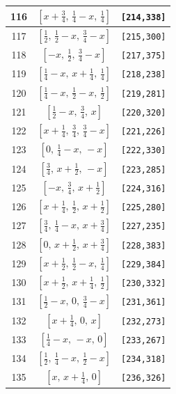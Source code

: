 \documentclass[fleqn,8pt]{jsarticle}
\begin{document}
\begin{longtable}{ccc}
116 & $\left[ x + \frac{3}{4},\, \frac{1}{4} - x,\, \frac{1}{4} \right]$ & {\tt [214,338]} \\ \hline
117 & $\left[ \frac{1}{2},\, \frac{1}{2} - x,\, \frac{3}{4} - x \right]$ & {\tt [215,300]} \\ \hline
118 & $\left[ - x,\, \frac{1}{2},\, \frac{3}{4} - x \right]$ & {\tt [217,375]} \\ \hline
119 & $\left[ \frac{1}{4} - x,\, x + \frac{1}{4},\, \frac{1}{4} \right]$ & {\tt [218,238]} \\ \hline
120 & $\left[ \frac{1}{4} - x,\, \frac{1}{2} - x,\, \frac{1}{2} \right]$ & {\tt [219,281]} \\ \hline
121 & $\left[ \frac{1}{2} - x,\, \frac{3}{4},\, x \right]$ & {\tt [220,320]} \\ \hline
122 & $\left[ x + \frac{1}{4},\, \frac{3}{4},\, \frac{3}{4} - x \right]$ & {\tt [221,226]} \\ \hline
123 & $\left[ 0,\, \frac{1}{4} - x,\, - x \right]$ & {\tt [222,330]} \\ \hline
124 & $\left[ \frac{3}{4},\, x + \frac{1}{2},\, - x \right]$ & {\tt [223,285]} \\ \hline
125 & $\left[ - x,\, \frac{3}{4},\, x + \frac{1}{2} \right]$ & {\tt [224,316]} \\ \hline
126 & $\left[ x + \frac{1}{4},\, \frac{1}{2},\, x + \frac{1}{2} \right]$ & {\tt [225,280]} \\ \hline
127 & $\left[ \frac{3}{4},\, \frac{1}{4} - x,\, x + \frac{3}{4} \right]$ & {\tt [227,235]} \\ \hline
128 & $\left[ 0,\, x + \frac{1}{2},\, x + \frac{3}{4} \right]$ & {\tt [228,383]} \\ \hline
129 & $\left[ x + \frac{1}{2},\, \frac{1}{2} - x,\, \frac{1}{4} \right]$ & {\tt [229,384]} \\ \hline
130 & $\left[ x + \frac{1}{2},\, x + \frac{1}{4},\, \frac{1}{2} \right]$ & {\tt [230,332]} \\ \hline
131 & $\left[ \frac{1}{2} - x,\, 0,\, \frac{3}{4} - x \right]$ & {\tt [231,361]} \\ \hline
132 & $\left[ x + \frac{1}{4},\, 0,\, x \right]$ & {\tt [232,273]} \\ \hline
133 & $\left[ \frac{1}{4} - x,\, - x,\, 0 \right]$ & {\tt [233,267]} \\ \hline
134 & $\left[ \frac{1}{2},\, \frac{1}{4} - x,\, \frac{1}{2} - x \right]$ & {\tt [234,318]} \\ \hline
135 & $\left[ x,\, x + \frac{1}{4},\, 0 \right]$ & {\tt [236,326]} \\ \hline

\end{longtable}
\end{document}
